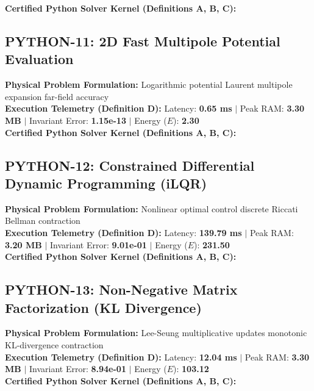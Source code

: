\textbf{Certified Python Solver Kernel (Definitions A, B, C):}


\vspace{1em}
\subsection{PYTHON-11: 2D Fast Multipole Potential Evaluation}
\textbf{Physical Problem Formulation:} Logarithmic potential Laurent multipole expansion far-field accuracy\\
\textbf{Execution Telemetry (Definition D):} Latency: \textbf{0.65 ms} $|$ Peak RAM: \textbf{3.30 MB} $|$ Invariant Error: \textbf{1.15e-13} $|$ Energy ($E$): \textbf{2.30}\\

\textbf{Certified Python Solver Kernel (Definitions A, B, C):}


\vspace{1em}
\subsection{PYTHON-12: Constrained Differential Dynamic Programming (iLQR)}
\textbf{Physical Problem Formulation:} Nonlinear optimal control discrete Riccati Bellman contraction\\
\textbf{Execution Telemetry (Definition D):} Latency: \textbf{139.79 ms} $|$ Peak RAM: \textbf{3.20 MB} $|$ Invariant Error: \textbf{9.01e-01} $|$ Energy ($E$): \textbf{231.50}\\

\textbf{Certified Python Solver Kernel (Definitions A, B, C):}


\vspace{1em}
\subsection{PYTHON-13: Non-Negative Matrix Factorization (KL Divergence)}
\textbf{Physical Problem Formulation:} Lee-Seung multiplicative updates monotonic KL-divergence contraction\\
\textbf{Execution Telemetry (Definition D):} Latency: \textbf{12.04 ms} $|$ Peak RAM: \textbf{3.30 MB} $|$ Invariant Error: \textbf{8.94e-01} $|$ Energy ($E$): \textbf{103.12}\\

\textbf{Certified Python Solver Kernel (Definitions A, B, C):}


